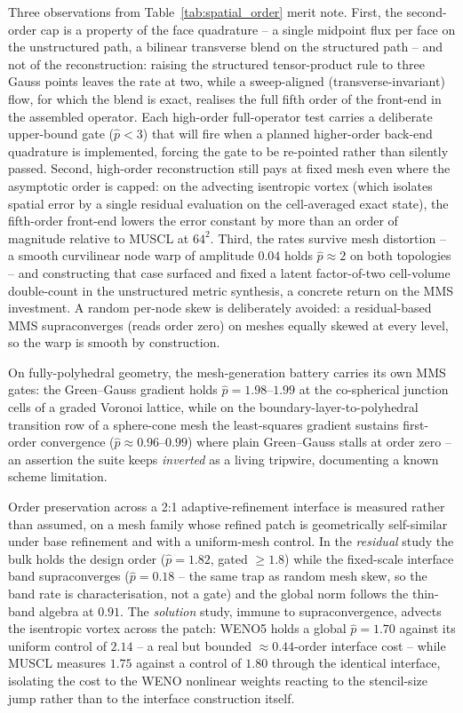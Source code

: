 \documentclass[journal,biblatex]{new-aiaa}
\begin{document}
Three observations from Table~\ref{tab:spatial_order} merit note. First, the second-order cap is a property of the face quadrature -- a single midpoint flux per face on the unstructured path, a bilinear transverse blend on the structured path -- and not of the reconstruction: raising the structured tensor-product rule to three Gauss points leaves the rate at two, while a sweep-aligned (transverse-invariant) flow, for which the blend is exact, realises the full fifth order of the front-end in the assembled operator. Each high-order full-operator test carries a deliberate upper-bound gate ($\hat p<3$) that will fire when a planned higher-order back-end quadrature is implemented, forcing the gate to be re-pointed rather than silently passed. Second, high-order reconstruction still pays at fixed mesh even where the asymptotic order is capped: on the advecting isentropic vortex (which isolates spatial error by a single residual evaluation on the cell-averaged exact state), the fifth-order front-end lowers the error constant by more than an order of magnitude relative to MUSCL at $64^2$. Third, the rates survive mesh distortion -- a smooth curvilinear node warp of amplitude $0.04$ holds $\hat p\approx2$ on both topologies -- and constructing that case surfaced and fixed a latent factor-of-two cell-volume double-count in the unstructured metric synthesis, a concrete return on the MMS investment. A random per-node skew is deliberately avoided: a residual-based MMS supraconverges (reads order zero) on meshes equally skewed at every level, so the warp is smooth by construction.

On fully-polyhedral geometry, the mesh-generation battery carries its own MMS gates: the Green--Gauss gradient holds $\hat p = 1.98$--$1.99$ at the co-spherical junction cells of a graded Voronoi lattice, while on the boundary-layer-to-polyhedral transition row of a sphere-cone mesh the least-squares gradient sustains first-order convergence ($\hat p\approx0.96$--$0.99$) where plain Green--Gauss stalls at order zero -- an assertion the suite keeps \emph{inverted} as a living tripwire, documenting a known scheme limitation.

Order preservation across a 2:1 adaptive-refinement interface is measured rather than assumed, on a mesh family whose refined patch is geometrically self-similar under base refinement and with a uniform-mesh control. In the \emph{residual} study the bulk holds the design order ($\hat p=1.82$, gated $\ge1.8$) while the fixed-scale interface band supraconverges ($\hat p=0.18$ -- the same trap as random mesh skew, so the band rate is characterisation, not a gate) and the global norm follows the thin-band algebra at $0.91$. The \emph{solution} study, immune to supraconvergence, advects the isentropic vortex across the patch: WENO5 holds a global $\hat p=1.70$ against its uniform control of $2.14$ -- a real but bounded $\approx0.44$-order interface cost -- while MUSCL measures $1.75$ against a control of $1.80$ through the identical interface, isolating the cost to the WENO nonlinear weights reacting to the stencil-size jump rather than to the interface construction itself.
\end{document}
